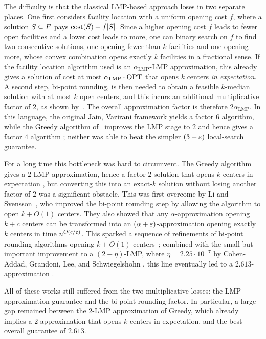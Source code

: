 The difficulty is that the classical LMP-based approach loses in two separate places.
One first considers facility location with a uniform opening cost $f$, where a solution $S\subseteq F$ pays $\text{cost}(S)+f|S|$.
Since a higher opening cost $f$ leads to fewer open facilities and a lower cost leads to more, one can binary search on $f$ to find two consecutive solutions, one opening fewer than $k$ facilities and one opening more, whose convex combination opens exactly $k$ facilities in a fractional sense.
If the facility location algorithm used is an $\alpha_{\mathrm{LMP}}$-LMP approximation, this already gives a solution of cost at most $\alpha_{\mathrm{LMP}}\cdot\textnormal{OPT}$ that opens $k$ centers \emph{in expectation}.
A second step, bi-point rounding, is then needed to obtain a feasible $k$-median solution with at most $k$ open centers, and this incurs an additional multiplicative factor of $2$, as shown by~\cite{JaV01}.
The overall approximation factor is therefore $2\alpha_{\mathrm{LMP}}$. In this language, the original Jain, Vazirani framework yields a factor $6$ algorithm, while the Greedy algorithm of~\cite{JMS02,JainMMSV03} improves the LMP stage to $2$ and hence gives a factor $4$ algorithm \cite{JaV01,JMS02,JainMMSV03}; neither was able to beat the simpler $(3+\varepsilon)$ local-search guarantee.

For a long time this bottleneck was hard to circumvent. The Greedy algorithm gives a $2$-LMP approximation, hence a factor-$2$ solution that opens $k$ centers in expectation \cite{JMS02,JainMMSV03}, but converting this into an exact-$k$ solution without losing another factor of $2$ was a significant obstacle.
This was first overcome by Li and Svensson~\cite{LiS16}, who improved the bi-point rounding step by allowing the algorithm to open $k+O(1)$ centers. They also showed that any $\alpha$-approximation opening $k+c$ centers can be transformed into an $(\alpha+\varepsilon)$-approximation opening exactly $k$ centers in time $n^{O(c/\varepsilon)}$. This sparked a sequence of refinements of bi-point rounding algorithms opening $k+ O(1)$ centers~\cite{ByrkaPRST17,GowdaPST23}; combined with the small but important improvement to a $(2-\eta)$-LMP, where $\eta = 2.25 \cdot 10^{-7}$ by Cohen-Addad, Grandoni, Lee, and Schwiegelshohn \cite{Cohen-AddadLS23}, this line eventually led to a $2.613$-approximation \cite{Cohen-AddadLS23,GowdaPST23}.

All of these works still suffered from the two multiplicative losses: the LMP approximation guarantee and the bi-point rounding factor. In particular, a large gap remained between the $2$-LMP approximation of Greedy, which already implies a $2$-approximation that opens $k$ centers in expectation, and the best overall guarantee of $2.613$.

